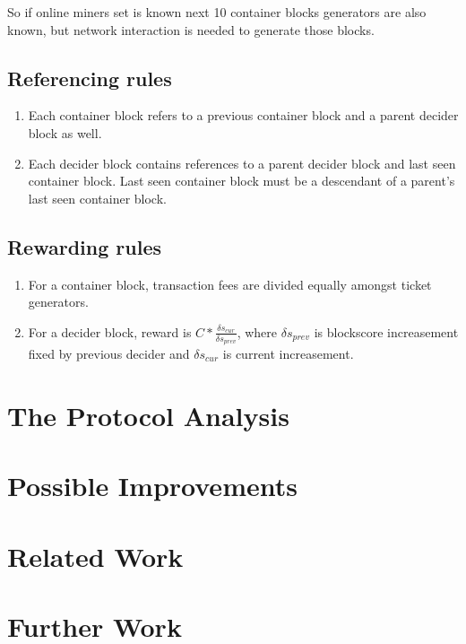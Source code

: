 \documentclass[number,preprint,review]{elsarticle}
\begin{document}
So if online miners set is known next 10 container blocks generators are also known, but network interaction is needed to generate those blocks. 


\subsection*{Referencing rules}

\begin{enumerate}
\item Each container block refers to a previous container block and a parent decider block as well. 
\item Each decider block contains references to a parent decider block and last seen container block. Last seen container block must be a descendant of a parent's last seen container block.  
\end{enumerate}

\subsection*{Rewarding rules}
\begin{enumerate}
\item For a container block, transaction fees are divided equally amongst ticket generators.
\item For a decider block, reward is \(C*\frac{\delta s_{cur}}{\delta s_{prev}} \), where \(\delta s_{prev}\) is blockscore 
increasement fixed by previous decider and \(\delta s_{cur}\) is current increasement.
\end{enumerate}



\section{The Protocol Analysis}


\section{Possible Improvements}
\label{prot_improv}



\section{Related Work}


\section{Further Work}
\end{document}
